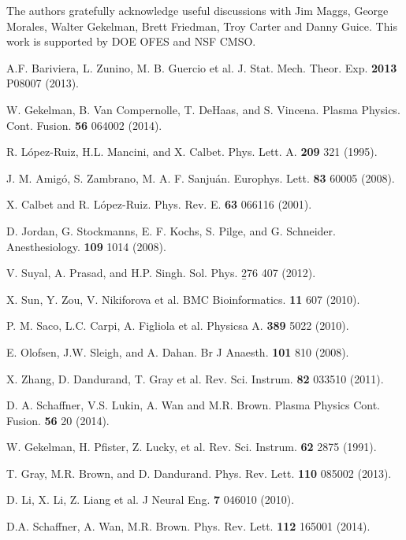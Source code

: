 \documentclass[aps,pre,twocolumn,secnumarabic,nobalancelastpage,amsmath,amssymb,
nofootinbib]{revtex4-1}
\begin{document}
The authors gratefully acknowledge useful discussions with Jim Maggs, George Morales, Walter Gekelman, Brett Friedman, Troy Carter and Danny Guice. This work is supported by DOE OFES and NSF CMSO.

\begin{thebibliography}{99}

A.F. Bariviera, L. Zunino, M. B. Guercio et al. J. Stat. Mech. Theor. Exp. {\bf 2013} P08007 (2013).

W. Gekelman, B. Van Compernolle, T. DeHaas, and S. Vincena. Plasma Physics. Cont. Fusion. {\bf 56} 064002 (2014).

R. L{\'o}pez-Ruiz, H.L. Mancini, and X. Calbet. Phys. Lett. A. {\bf 209} 321 (1995).

J. M. Amig{\'o}, S. Zambrano, M. A. F. Sanju{\'a}n. Europhys. Lett. {\bf 83} 60005 (2008).

X. Calbet and R.  L{\'o}pez-Ruiz. Phys. Rev. E. {\bf 63} 066116 (2001).

D. Jordan, G. Stockmanns, E. F. Kochs, S. Pilge, and G. Schneider. Anesthesiology. {\bf 109} 1014 (2008).

V. Suyal, A. Prasad, and H.P. Singh. Sol. Phys. {\b 276} 407 (2012).

X. Sun, Y. Zou, V. Nikiforova et al. BMC Bioinformatics. {\bf 11} 607 (2010).

P. M. Saco, L.C. Carpi, A. Figliola et al. Physicsa A. {\bf 389} 5022 (2010).

E. Olofsen, J.W. Sleigh, and A. Dahan. Br J Anaesth. {\bf 101} 810 (2008).

X. Zhang, D. Dandurand, T. Gray et al. Rev. Sci. Instrum. {\bf 82} 033510 (2011).

D. A. Schaffner, V.S. Lukin, A. Wan and M.R. Brown. Plasma Physics Cont. Fusion. {\bf 56} 20 (2014).

W. Gekelman, H. Pfister, Z. Lucky, et al. Rev. Sci. Instrum. {\bf 62} 2875 (1991).

T. Gray, M.R. Brown, and D. Dandurand. Phys. Rev. Lett. {\bf 110} 085002 (2013).

D. Li, X. Li, Z. Liang et al. J Neural Eng. {\bf 7} 046010 (2010).

D.A. Schaffner, A. Wan, M.R. Brown. Phys. Rev. Lett. {\bf 112} 165001 (2014).


\end{thebibliography}
\end{document}
